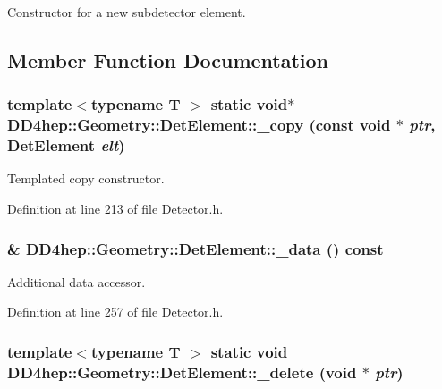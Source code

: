 Constructor for a new subdetector element. 

\subsection{Member Function Documentation}
\hypertarget{class_d_d4hep_1_1_geometry_1_1_det_element_ae801dc42d4da36cac2d1ad0f37ecd97b}{
\subsubsection[{\_\-copy}]{\setlength{\rightskip}{0pt plus 5cm}template$<$typename T $>$ static void$\ast$ DD4hep::Geometry::DetElement::\_\-copy (const void $\ast$ {\em ptr}, \/  {\bf DetElement} {\em elt})}}
\label{class_d_d4hep_1_1_geometry_1_1_det_element_ae801dc42d4da36cac2d1ad0f37ecd97b}


Templated copy constructor. 

Definition at line 213 of file Detector.h.\hypertarget{class_d_d4hep_1_1_geometry_1_1_det_element_ae8dbb28c9b63b2500ca650c9fec0605b}{
\subsubsection[{\_\-data}]{\& DD4hep::Geometry::DetElement::\_\-data () const}}
\label{class_d_d4hep_1_1_geometry_1_1_det_element_ae8dbb28c9b63b2500ca650c9fec0605b}


Additional data accessor. 

Definition at line 257 of file Detector.h.\hypertarget{class_d_d4hep_1_1_geometry_1_1_det_element_ab665e62a12e41f53be9193dda76e5e3a}{
\subsubsection[{\_\-delete}]{\setlength{\rightskip}{0pt plus 5cm}template$<$typename T $>$ static void DD4hep::Geometry::DetElement::\_\-delete (void $\ast$ {\em ptr})}}
\label{class_d_d4hep_1_1_geometry_1_1_det_element_ab665e62a12e41f53be9193dda76e5e3a}


